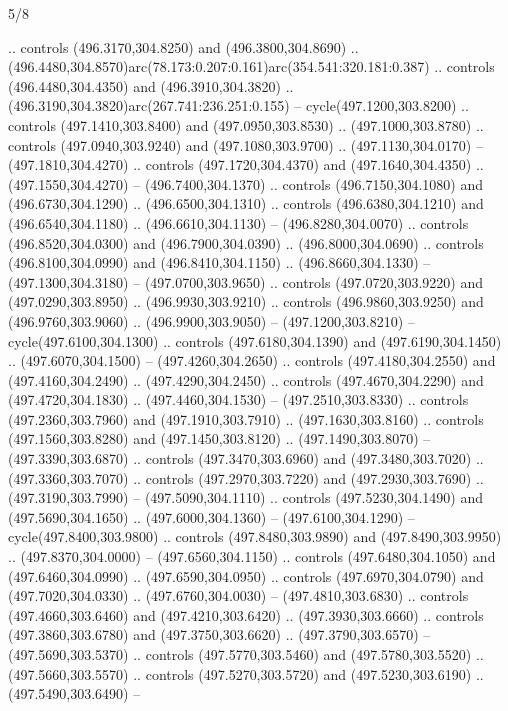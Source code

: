 \begin{flagdescription}{5/8}
\begin{scope}[xshift=0.5\flaglength,yshift=0.5\flagwidth,scale=\flagwidth/475.63]
\begin{scope}[y=0.8pt, x=0.8pt, yscale=-1, xscale=1,shift={(-450,-300)}]
\begin{scope}[cm={{1.0,0.0,0.0,1.0,(-0.0002,0.12556)}},cm={{1.0,0.0,0.0,1.0,(0.00179,0.0)}}]
\begin{scope}[cm={{1.11592,0.0,0.0,1.11592,(-106.89933,-41.77764)}}]
\begin{scope}[draw=black,fill=cfff]
\begin{scope}[fill=black]
  .. controls (496.3170,304.8250) and (496.3800,304.8690) ..
  (496.4480,304.8570)arc(78.173:0.207:0.161)arc(354.541:320.181:0.387) ..
  controls (496.4480,304.4350) and (496.3910,304.3820) ..
  (496.3190,304.3820)arc(267.741:236.251:0.155) -- cycle(497.1200,303.8200) ..
  controls (497.1410,303.8400) and (497.0950,303.8530) .. (497.1000,303.8780) ..
  controls (497.0940,303.9240) and (497.1080,303.9700) .. (497.1130,304.0170) --
  (497.1810,304.4270) .. controls (497.1720,304.4370) and (497.1640,304.4350) ..
  (497.1550,304.4270) -- (496.7400,304.1370) .. controls (496.7150,304.1080) and
  (496.6730,304.1290) .. (496.6500,304.1310) .. controls (496.6380,304.1210) and
  (496.6540,304.1180) .. (496.6610,304.1130) -- (496.8280,304.0070) .. controls
  (496.8520,304.0300) and (496.7900,304.0390) .. (496.8000,304.0690) .. controls
  (496.8100,304.0990) and (496.8410,304.1150) .. (496.8660,304.1330) --
  (497.1300,304.3180) -- (497.0700,303.9650) .. controls (497.0720,303.9220) and
  (497.0290,303.8950) .. (496.9930,303.9210) .. controls (496.9860,303.9250) and
  (496.9760,303.9060) .. (496.9900,303.9050) -- (497.1200,303.8210) --
  cycle(497.6100,304.1300) .. controls (497.6180,304.1390) and
  (497.6190,304.1450) .. (497.6070,304.1500) -- (497.4260,304.2650) .. controls
  (497.4180,304.2550) and (497.4160,304.2490) .. (497.4290,304.2450) .. controls
  (497.4670,304.2290) and (497.4720,304.1830) .. (497.4460,304.1530) --
  (497.2510,303.8330) .. controls (497.2360,303.7960) and (497.1910,303.7910) ..
  (497.1630,303.8160) .. controls (497.1560,303.8280) and (497.1450,303.8120) ..
  (497.1490,303.8070) -- (497.3390,303.6870) .. controls (497.3470,303.6960) and
  (497.3480,303.7020) .. (497.3360,303.7070) .. controls (497.2970,303.7220) and
  (497.2930,303.7690) .. (497.3190,303.7990) -- (497.5090,304.1110) .. controls
  (497.5230,304.1490) and (497.5690,304.1650) .. (497.6000,304.1360) --
  (497.6100,304.1290) -- cycle(497.8400,303.9800) .. controls
  (497.8480,303.9890) and (497.8490,303.9950) .. (497.8370,304.0000) --
  (497.6560,304.1150) .. controls (497.6480,304.1050) and (497.6460,304.0990) ..
  (497.6590,304.0950) .. controls (497.6970,304.0790) and (497.7020,304.0330) ..
  (497.6760,304.0030) -- (497.4810,303.6830) .. controls (497.4660,303.6460) and
  (497.4210,303.6420) .. (497.3930,303.6660) .. controls (497.3860,303.6780) and
  (497.3750,303.6620) .. (497.3790,303.6570) -- (497.5690,303.5370) .. controls
  (497.5770,303.5460) and (497.5780,303.5520) .. (497.5660,303.5570) .. controls
  (497.5270,303.5720) and (497.5230,303.6190) .. (497.5490,303.6490) --

\end{scope}
\end{scope}
\end{scope}
\end{scope}
\end{scope}
\end{scope}
\end{flagdescription}
